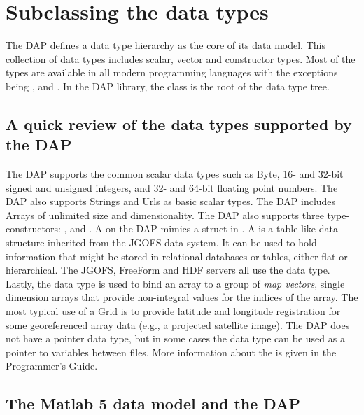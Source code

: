 \documentclass{dods-paper}
\begin{document}
\section{Subclassing the data types}

The DAP defines a data type hierarchy as the core of its data model. This
collection of data types includes scalar, vector and constructor types. Most
of the types are available in all modern programming languages with the
exceptions being ,  and . In the DAP
library, the class  is the root of the data type tree.


\subsection{A quick review of the data types supported by the DAP}

The DAP supports the common scalar data types such as Byte, 16- and 32-bit
signed and unsigned integers, and 32- and 64-bit floating point numbers. The
DAP also supports Strings and Urls as basic scalar types. The DAP includes
Arrays of unlimited size and dimensionality. The DAP also supports three
type-constructors: ,  and . A
 on the DAP mimics a struct in . A  is a
table-like data structure inherited from the JGOFS data system. It can be
used to hold information that might be stored in relational databases or
tables, either flat or hierarchical. The JGOFS, FreeForm and HDF servers all
use the  data type. Lastly, the  data type is used to
bind an array to a group of \emph{map vectors}, single dimension arrays that
provide non-integral values for the indices of the array. The most typical
use of a Grid is to provide latitude and longitude registration for some
georeferenced array data (e.g., a projected satellite image). The DAP does
not have a pointer data type, but in some cases the  data type can
be used as a pointer to variables between files. More information about the
is given in the Programmer's Guide.

\subsection{The Matlab 5 data model and the DAP}
\end{document}
